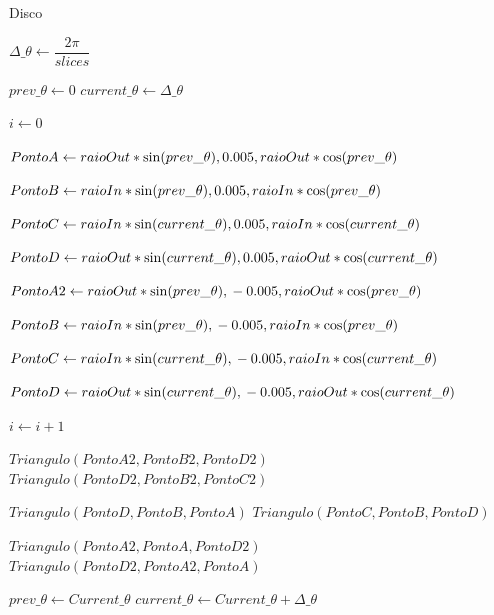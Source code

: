 \begin{algorithm}
\caption{Disco}\label{alg:sec1:disco}
\begin{algorithmic}[1]
\State $\Delta\_\theta \gets \dfrac{2\pi}{slices}$


\State $prev\_\theta \gets 0$
\State $current\_\theta \gets \Delta\_\theta$

\State $i \gets 0$

\State $Ponto A \gets raioOut*\sin(prev\_\theta),
\newline 0.005,
\newline raioOut*\cos(prev\_\theta)$

\State $Ponto B \gets raioIn*\sin(prev\_\theta),
\newline 0.005,
\newline raioIn*\cos(prev\_\theta)$

\State $Ponto C \gets raioIn*\sin(current\_\theta),
\newline 0.005,
\newline raioIn*\cos(current\_\theta)$

\State $Ponto D \gets raioOut*\sin(current\_\theta),
\newline  0.005,
\newline raioOut*\cos(current\_\theta)$

\State $Ponto A2 \gets raioOut*\sin(prev\_\theta),
\newline -0.005,
\newline raioOut*\cos(prev\_\theta)$

\State $Ponto B \gets raioIn*\sin(prev\_\theta),
\newline -0.005,
\newline raioIn*\cos(prev\_\theta)$

\State $Ponto C \gets raioIn*\sin(current\_\theta),
\newline -0.005,
\newline raioIn*\cos(current\_\theta)$

\State $Ponto D \gets raioOut*\sin(current\_\theta),
\newline  -0.005,
\newline raioOut*\cos(current\_\theta)$

\State $i \gets i + 1$ 

\State $Triangulo(Ponto A2, Ponto B2, Ponto D2)$
\State $Triangulo(Ponto D2, Ponto B2, Ponto C2)$

\State $Triangulo(Ponto D, Ponto B, Ponto A)$
\State $Triangulo(Ponto C, Ponto B, Ponto D)$

\State $Triangulo(Ponto A2, Ponto A, Ponto D2)$
\State $Triangulo(Ponto D2, Ponto A2, Ponto A)$

\State $prev\_\theta \gets Current\_\theta$
\State $current\_\theta \gets Current\_\theta + \Delta\_\theta$



\EndWhile
\end{algorithmic}
\end{algorithm}